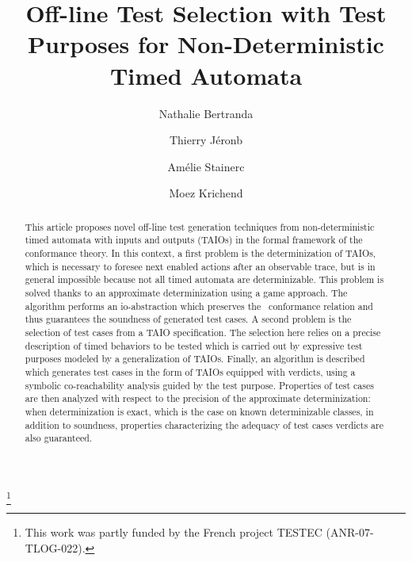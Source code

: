 \documentclass{LMCS}
\theoremstyle{plain}\newtheorem{proposition}[thm]{Proposition}
\begin{document}
\title[Off-line test selection with test purposes 
for non-det. timed automata]{Off-line Test Selection with Test Purposes 
for Non-Deterministic Timed Automata\rsuper*}
\thanks{This work was partly funded by the French project TESTEC (ANR-07-TLOG-022).}

\author[N.~Bertrand]{Nathalie Bertrand\rsuper a}	\address{{}Inria Rennes - Bretagne Atlantique, Rennes, France}  

\author[T.~J\'eron]{Thierry J\'eron\rsuper b}	\address{ pt}	

\author[A.~Stainer]{Am\'elie Stainer\rsuper c}	\address{{\lsuper c}University of Rennes 1,  Rennes, France}	  


\author[M.~Krichen]{Moez Krichen\rsuper d}	\address{{\lsuper d}University of Sfax, Tunisia}	  









\begin{abstract} 
  \noindent This article proposes novel off-line test generation
  techniques from non-deter\-ministic timed automata with inputs and
  outputs (TAIOs) in the formal framework of the \tioco\, conformance
  theory.  In this context, a first problem is the determinization of
  TAIOs, which is necessary to foresee next enabled actions after an
  observable trace, but is in general impossible because not all timed
  automata are determinizable. This problem is solved thanks to an
  approximate determinization using a game approach.
The algorithm performs an io-abstraction which preserves the
    \tioco\, conformance relation and thus guarantees the soundness of
    generated test cases.
A second problem is the selection of test cases from a TAIO
    specification.  The selection here relies on a precise description
    of timed behaviors to be tested which is carried out by expressive
    test purposes modeled by a generalization of TAIOs.  Finally, an
    algorithm is described which generates test cases in the form of
    TAIOs equipped with verdicts, using a symbolic co-reachability
    analysis guided by the test purpose.  Properties of test cases are
    then analyzed with respect to the precision of the approximate
    determinization: when determinization is exact,
which is the case on known determinizable classes, in addition to
    soundness, properties characterizing the adequacy of test cases
    verdicts are also guaranteed.
\end{abstract}
\end{document}
